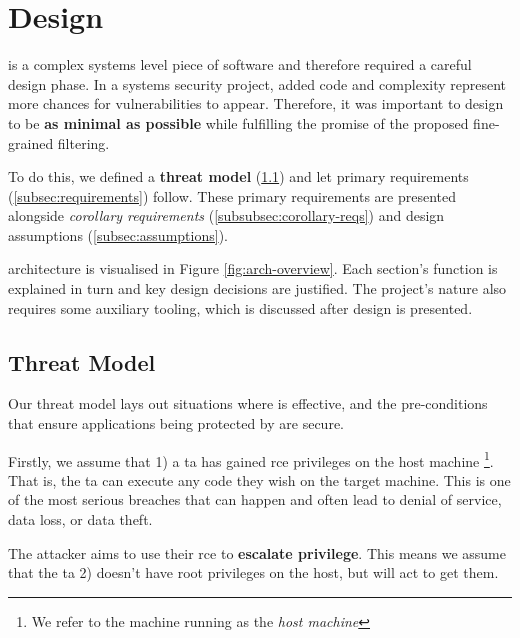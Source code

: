 \section{Design} \label{sec:design}

%
        

\af is a complex systems level piece of software and therefore required a
careful design phase. In a systems security project, added code and complexity
represent more chances for vulnerabilities to appear. Therefore, it was
important to design \af to be \textbf{as minimal as possible} while fulfilling
the promise of the proposed fine-grained filtering.

To do this, we defined a \textbf{threat model} (\ref{subsec:threat-model}) and
let primary requirements (\ref{subsec:requirements}) follow. These primary
requirements are presented alongside \textit{corollary requirements}
(\ref{subsubsec:corollary-reqs}) and design assumptions
(\ref{subsec:assumptions}).

\afg architecture is visualised in Figure \ref{fig:arch-overview}. Each
section's function is explained in turn and key design decisions are justified.
The project's nature also requires some auxiliary tooling, which is discussed
after \afg design is presented.

\subsection{Threat Model}\label{subsec:threat-model}

Our threat model lays out situations where \af is effective, and the 
pre-conditions that ensure applications being protected by \af are secure.

Firstly, we assume that 1) a \ac{ta} has gained \ac{rce} privileges on the host
machine \footnote{We refer to the machine running \af as the \textit{host
machine}}. That is, the \ac{ta} can execute any code they wish on the target
machine. This is one of the most serious breaches that can happen and often
lead to denial of service, data loss, or data theft.%

The attacker aims to use their \ac{rce} to \textbf{escalate privilege}. This
means we assume that the \ac{ta} 2) doesn't have root privileges on the host,
but will act to get them.


